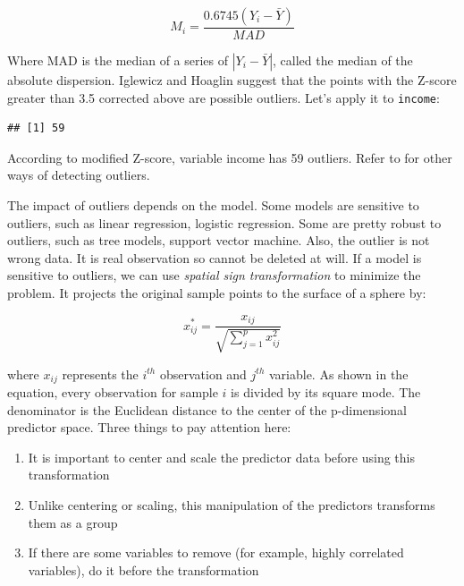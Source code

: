 \documentclass[12pt,]{krantz}
\newenvironment{Shaded}{\begin{snugshade}}{\end{snugshade}}
\newcommand{\KeywordTok}[1]{\textcolor[rgb]{0.13,0.29,0.53}{\textbf{#1}}}
\newcommand{\FloatTok}[1]{\textcolor[rgb]{0.00,0.00,0.81}{#1}}
\newcommand{\CommentTok}[1]{\textcolor[rgb]{0.56,0.35,0.01}{\textit{#1}}}
\newcommand{\OperatorTok}[1]{\textcolor[rgb]{0.81,0.36,0.00}{\textbf{#1}}}
\newcommand{\NormalTok}[1]{#1}
\providecommand{\tightlist}{%
  \setlength{\itemsep}{0pt}\setlength{\parskip}{0pt}}
\theoremstyle{definition}
\theoremstyle{definition}
\theoremstyle{definition}
\theoremstyle{remark}
\begin{document}
\[M_{i}=\frac{0.6745(Y_{i}-\bar{Y})}{MAD}\]

Where MAD is the median of a series of \(|Y_ {i} - \bar{Y}|\), called
the median of the absolute dispersion. Iglewicz and Hoaglin suggest that
the points with the Z-score greater than 3.5 corrected above are
possible outliers. Let's apply it to \texttt{income}:

\begin{Shaded}
\end{Shaded}

\begin{verbatim}
## [1] 59
\end{verbatim}

According to modified Z-score, variable income has 59 outliers. Refer to
\citep{mad1} for other ways of detecting outliers.

The impact of outliers depends on the model. Some models are sensitive
to outliers, such as linear regression, logistic regression. Some are
pretty robust to outliers, such as tree models, support vector machine.
Also, the outlier is not wrong data. It is real observation so cannot be
deleted at will. If a model is sensitive to outliers, we can use
\emph{spatial sign transformation} \citep{ssp} to minimize the problem.
It projects the original sample points to the surface of a sphere by:

\[x_{ij}^{*}=\frac{x_{ij}}{\sqrt{\sum_{j=1}^{p}x_{ij}^{2}}}\]

where \(x_{ij}\) represents the \(i^{th}\) observation and \(j^{th}\)
variable. As shown in the equation, every observation for sample \(i\)
is divided by its square mode. The denominator is the Euclidean distance
to the center of the p-dimensional predictor space. Three things to pay
attention here:

\begin{enumerate}
\def\labelenumi{\arabic{enumi}.}
\tightlist
\item
  It is important to center and scale the predictor data before using
  this transformation
\item
  Unlike centering or scaling, this manipulation of the predictors
  transforms them as a group
\item
  If there are some variables to remove (for example, highly correlated
  variables), do it before the transformation
\end{enumerate}
\end{document}
